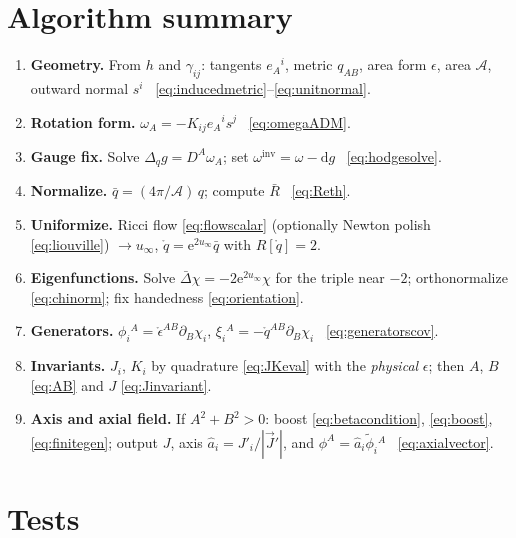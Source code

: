 \documentclass[11pt]{article}
\newcommand{\dd}{\mathrm{d}}
\newcommand{\ee}{\mathrm{e}}
\newcommand{\qo}{\mathring{q}}          %
\newcommand{\epso}{\mathring{\epsilon}} %
\newcommand{\vJ}{\vec{J}}
\begin{document}
\section{Algorithm summary}
\label{sec:summary}

\begin{enumerate}
\item \textbf{Geometry.}  From $h$ and $\gamma_{ij}$: tangents $e_A{}^i$,
  metric $q_{AB}$, area form $\epsilon$, area $\mathcal{A}$, outward normal
  $s^i$ \ \eqref{eq:inducedmetric}--\eqref{eq:unitnormal}.
\item \textbf{Rotation form.}  $\omega_A = -K_{ij}e_A{}^i s^j$
  \ \eqref{eq:omegaADM}.
\item \textbf{Gauge fix.}  Solve $\Delta_q g = D^A\omega_A$; set
  $\omega^{\mathrm{inv}} = \omega - \dd g$ \ \eqref{eq:hodgesolve}.
\item \textbf{Normalize.}  $\bar q = (4\pi/\mathcal{A})\,q$; compute
  $\bar R$ \ \eqref{eq:Reth}.
\item \textbf{Uniformize.}  Ricci flow \eqref{eq:flowscalar} (optionally
  Newton polish \eqref{eq:liouville}) $\to u_\infty$,
  $\qo = \ee^{2u_\infty}\bar q$ with $R[\qo]=2$.
\item \textbf{Eigenfunctions.}  Solve
  $\bar\Delta\chi = -2\ee^{2u_\infty}\chi$ for the triple near $-2$;
  orthonormalize \eqref{eq:chinorm}; fix handedness \eqref{eq:orientation}.
\item \textbf{Generators.}  $\phi_i{}^A = \epso^{AB}\partial_B\chi_i$,
  $\xi_i{}^A = -\qo^{AB}\partial_B\chi_i$ \ \eqref{eq:generatorscov}.
\item \textbf{Invariants.}  $J_i$, $K_i$ by quadrature \eqref{eq:JKeval}
  with the \emph{physical} $\epsilon$; then $A$, $B$ \eqref{eq:AB} and
  $J$ \eqref{eq:Jinvariant}.
\item \textbf{Axis and axial field.}  If $A^2+B^2>0$: boost
  \eqref{eq:betacondition}, \eqref{eq:boost}, \eqref{eq:finitegen}; output
  $J$, axis $\hat a_i = J'_i/|\vJ'|$, and
  $\phi^A = \hat a_i\tilde\phi_i{}^A$ \ \eqref{eq:axialvector}.
\end{enumerate}

\section{Tests}
\label{sec:tests}
\end{document}
